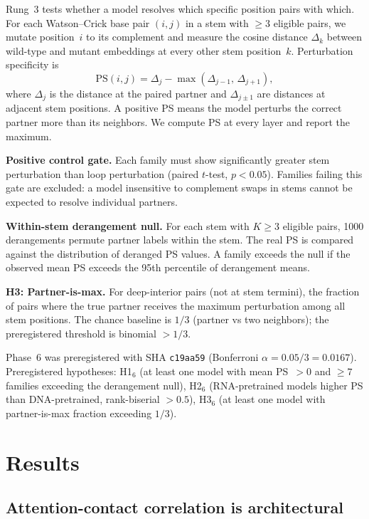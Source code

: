 \documentclass[11pt]{article}
\begin{document}
Rung~3 tests whether a model resolves which specific position pairs
with which.  For each Watson--Crick base pair $(i, j)$ in a stem with
$\geq 3$ eligible pairs, we mutate position~$i$ to its complement and
measure the cosine distance $\Delta_k$ between wild-type and mutant
embeddings at every other stem position~$k$.  Perturbation specificity
is
\[
  \mathrm{PS}(i, j) = \Delta_j - \max(\Delta_{j-1},\, \Delta_{j+1}),
\]
where $\Delta_j$ is the distance at the paired partner and
$\Delta_{j \pm 1}$ are distances at adjacent stem positions.  A
positive PS means the model perturbs the correct partner more than its
neighbors.  We compute PS at every layer and report the maximum.

\textbf{Positive control gate.}  Each family must show significantly
greater stem perturbation than loop perturbation (paired $t$-test,
$p < 0.05$).  Families failing this gate are excluded: a model
insensitive to complement swaps in stems cannot be expected to resolve
individual partners.

\textbf{Within-stem derangement null.}  For each stem with
$K \geq 3$ eligible pairs, 1000 derangements permute partner labels
within the stem.  The real PS is compared against the distribution of
deranged PS values.  A family exceeds the null if the observed mean PS
exceeds the 95th percentile of derangement means.

\textbf{H3: Partner-is-max.}  For deep-interior pairs (not at stem
termini), the fraction of pairs where the true partner receives the
maximum perturbation among all stem positions.  The chance baseline is
$1/3$ (partner vs two neighbors); the preregistered threshold is
binomial $> 1/3$.

Phase~6 was preregistered with SHA \texttt{c19aa59} (Bonferroni
$\alpha = 0.05/3 = 0.0167$).  Preregistered hypotheses: H1$_6$
(at least one model with mean PS~$> 0$ and $\geq 7$ families exceeding
the derangement null), H2$_6$ (RNA-pretrained models higher PS than
DNA-pretrained, rank-biserial $> 0.5$), H3$_6$ (at least one model
with partner-is-max fraction exceeding $1/3$).


\section{Results}
\label{sec:results}

\subsection{Attention-contact correlation is architectural}
\label{sec:attn_results}
\end{document}
